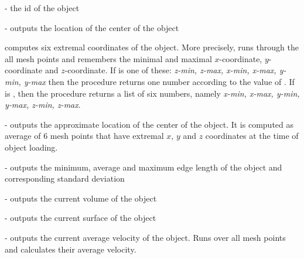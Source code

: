 \begin{arguments}
\item[\var{oid}] - the id of the object
\item[\opt{origin}] - outputs the location of the center of the object
\item[\opt{pos-bounds \var{bname}}] computes six extremal coordinates of the object. More precisely, runs through the all mesh points and remembers the minimal and maximal $x$-coordinate, $y$-coordinate and $z$-coordinate. If  is one of these: \textit{z-min, z-max, x-min, x-max, y-min, y-max} then the procedure returns one number according to the value of . If  is , then the procedure returns a list of six numbers, namely \textit{x-min, x-max, y-min, y-max, z-min, z-max}.
\item[\opt{approx-pos}] - outputs the approximate location of the center of the object. It is computed as average of 6 mesh points that have extremal $x$, $y$ and $z$ coordinates at the time of object loading.
\item[\opt{edge-statistics}] - outputs the minimum, average and maximum edge length of the object and corresponding standard deviation 
\item[\opt{volume}] - outputs the current volume of the object
\item[\opt{surface-area}] - outputs the current surface of the object
\item[\opt{velocity}] - outputs the current average velocity of the object. Runs over all mesh points and calculates their average velocity.

\end{arguments}
